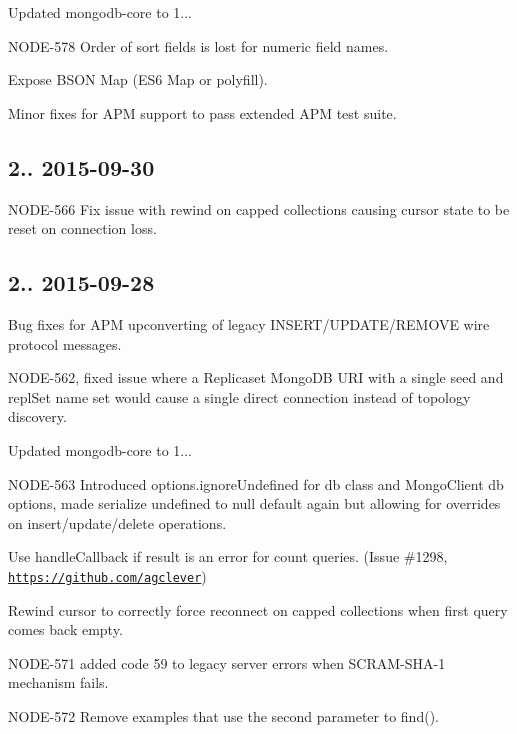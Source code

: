 \begin{DoxyItemize}
\item Updated mongodb-\/core to 1...
\item N\+O\+D\+E-\/578 Order of sort fields is lost for numeric field names.
\item Expose B\+S\+ON Map (E\+S6 Map or polyfill).
\item Minor fixes for A\+PM support to pass extended A\+PM test suite.
\end{DoxyItemize}

\subsection*{2.. 2015-\/09-\/30 }


\begin{DoxyItemize}
\item N\+O\+D\+E-\/566 Fix issue with rewind on capped collections causing cursor state to be reset on connection loss.
\end{DoxyItemize}

\subsection*{2.. 2015-\/09-\/28 }


\begin{DoxyItemize}
\item Bug fixes for A\+PM upconverting of legacy I\+N\+S\+E\+R\+T/\+U\+P\+D\+A\+T\+E/\+R\+E\+M\+O\+VE wire protocol messages.
\item N\+O\+D\+E-\/562, fixed issue where a Replicaset Mongo\+DB U\+RI with a single seed and repl\+Set name set would cause a single direct connection instead of topology discovery.
\item Updated mongodb-\/core to 1...
\item N\+O\+D\+E-\/563 Introduced options.\+ignore\+Undefined for db class and Mongo\+Client db options, made serialize undefined to null default again but allowing for overrides on insert/update/delete operations.
\item Use handle\+Callback if result is an error for count queries. (Issue \#1298, \href{https://github.com/agclever}{\tt https\+://github.\+com/agclever})
\item Rewind cursor to correctly force reconnect on capped collections when first query comes back empty.
\item N\+O\+D\+E-\/571 added code 59 to legacy server errors when S\+C\+R\+A\+M-\/\+S\+H\+A-\/1 mechanism fails.
\item N\+O\+D\+E-\/572 Remove examples that use the second parameter to {\ttfamily find()}.
\end{DoxyItemize}

